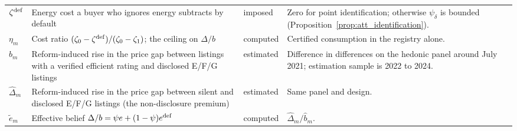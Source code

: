 \begin{table}[htbp]
\begin{tabular}{@{}llll@{}}
\parbox[t]{.09\textwidth}{\raggedright $\zeta^{\rm def}$} & \parbox[t]{.30\textwidth}{\raggedright Energy cost a buyer who ignores energy subtracts by default} & \parbox[t]{.14\textwidth}{\raggedright imposed} & \parbox[t]{.37\textwidth}{\raggedright Zero for point identification; otherwise $\psi_\delta$ is bounded (Proposition~\ref{prop:att_identification}).} \\[12pt]
\parbox[t]{.09\textwidth}{\raggedright $\eta_m$} & \parbox[t]{.30\textwidth}{\raggedright Cost ratio $(\zeta_0-\zeta^{\rm def})/(\zeta_0-\zeta_1)$; the ceiling on $\Delta/b$} & \parbox[t]{.14\textwidth}{\raggedright computed} & \parbox[t]{.37\textwidth}{\raggedright Certified consumption in the registry alone.} \\[12pt]
\parbox[t]{.09\textwidth}{\raggedright $\hat b_m$} & \parbox[t]{.30\textwidth}{\raggedright Reform-induced rise in the price gap between listings with a verified efficient rating and disclosed E/F/G listings} & \parbox[t]{.14\textwidth}{\raggedright estimated} & \parbox[t]{.37\textwidth}{\raggedright Difference in differences on the hedonic panel around July 2021; estimation sample is 2022 to 2024.} \\[12pt]
\parbox[t]{.09\textwidth}{\raggedright $\hat\Delta_m$} & \parbox[t]{.30\textwidth}{\raggedright Reform-induced rise in the price gap between silent and disclosed E/F/G listings (the non-disclosure premium)} & \parbox[t]{.14\textwidth}{\raggedright estimated} & \parbox[t]{.37\textwidth}{\raggedright Same panel and design.} \\[12pt]
\parbox[t]{.09\textwidth}{\raggedright $\tilde e_m$} & \parbox[t]{.30\textwidth}{\raggedright Effective belief $\Delta/b=\psi e+(1-\psi)e^{\rm def}$} & \parbox[t]{.14\textwidth}{\raggedright computed} & \parbox[t]{.37\textwidth}{\raggedright $\hat\Delta_m/\hat b_m$.} \\[12pt]
\bottomrule
\end{tabular}
\end{table}

